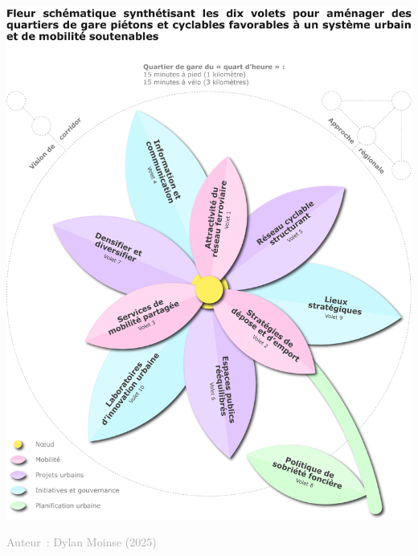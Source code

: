 \documentclass[../main.tex]{subfiles}
\begin{document}
\begin{center}\vspace*{10pt}
    \includegraphics[width=\columnwidth]{figures/policy-brief-schema.pdf}
    \label{overview}
    \vspace{-0.5cm}
    \begin{flushright}
            \scriptsize{\textcolor{darkgray}{Auteur~: Dylan Moinse (2025)}}
    \end{flushright}
\end{center}

    
\end{document}
